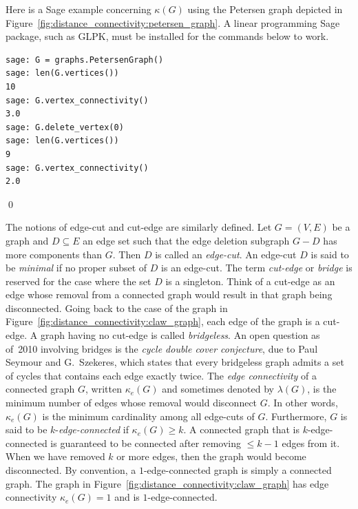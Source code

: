 \begin{example}
\rm
Here is a Sage example concerning $\kappa(G)$ using the
Petersen graph depicted in
Figure~\ref{fig:distance_connectivity:petersen_graph}. A linear
programming Sage package, such as GLPK, must be installed for the
commands below to work.
\begin{lstlisting}
sage: G = graphs.PetersenGraph()
sage: len(G.vertices())
10
sage: G.vertex_connectivity()
3.0
sage: G.delete_vertex(0)
sage: len(G.vertices())
9
sage: G.vertex_connectivity()
2.0
\end{lstlisting}
\qed
\end{example}

The notions of edge-cut and cut-edge are similarly defined. Let
$G = (V,E)$ be a graph and $D \subseteq E$ an edge set such that the
edge deletion subgraph $G - D$ has more components than $G$. Then $D$
is called an \emph{edge-cut}. An edge-cut $D$ is said
to be \emph{minimal} if no proper subset of $D$ is an edge-cut. The
term \emph{cut-edge} or \emph{bridge} is
reserved for the case where the set $D$ is a singleton. Think of a
cut-edge as an edge whose removal from a connected graph would result
in that graph being disconnected. Going back to the case of the graph
in Figure~\ref{fig:distance_connectivity:claw_graph}, each edge of the
graph is a cut-edge. A graph having no cut-edge is called
\emph{bridgeless}. An open question as of~2010
involving bridges is the
\emph{cycle double cover conjecture},
due to Paul Seymour and G.~Szekeres,
which states that every bridgeless graph admits a set of cycles that
contains each edge exactly twice. The \emph{edge connectivity} of a
connected graph $G$, written $\kappa_e(G)$ and
sometimes denoted by $\lambda(G)$, is the minimum
number of edges whose removal would disconnect $G$. In other words,
$\kappa_e(G)$ is the minimum cardinality among all edge-cuts of
$G$. Furthermore, $G$ is said to be
$k$-\emph{edge-connected} if
$\kappa_e(G) \geq k$. A connected graph that is $k$-edge-connected is
guaranteed to be connected after removing $\leq k - 1$ edges from
it. When we have removed $k$ or more edges, then the graph would
become disconnected. By convention, a $1$-edge-connected graph is
simply a connected graph. The graph in
Figure~\ref{fig:distance_connectivity:claw_graph} has edge
connectivity $\kappa_e(G) = 1$ and is $1$-edge-connected.

